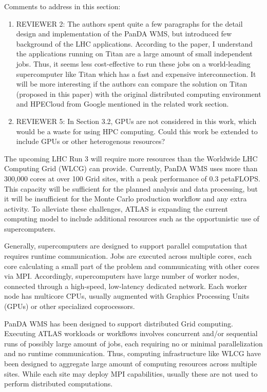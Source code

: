 \ifreview
Comments to address in this section:
\begin{enumerate}
	\item REVIEWER 2: The authors spent quite a few paragraphs for the detail
	design and implementation of the PanDA WMS, but introduced few background
	of the LHC applications. According to the paper, I understand the
	applications running on Titan are a large amount of small independent
	jobs. Thus, it seems less cost-effective to run these jobs on a
	world-leading supercomputer like Titan which has a fast and expensive
	interconnection. It will be more interesting if the authors can compare
	the solution on Titan (proposed in this paper) with the original
	distributed computing environment and HPECloud from Google mentioned in
	the related work section.
	\item REVIEWER 5: In Section 3.2, GPUs are not considered in this work,
	which would be a waste for using HPC computing. Could this work be
	extended to include GPUs or other heterogenous resources?
\end{enumerate}
\fi

The upcoming LHC Run 3 will require more resources than the Worldwide LHC
Computing Grid (WLCG) can provide. Currently, PanDA WMS uses more than
300,000 cores at over 100 Grid sites, with a peak performance of 0.3
petaFLOPS. This capacity will be sufficient for the planned analysis and data
processing, but it will be insufficient for the Monte Carlo production
workflow and any extra activity. To alleviate these challenges, ATLAS is
expanding the current computing model to include additional resources such as
the opportunistic use of supercomputers.

Generally, supercomputers are designed to support parallel computation that
requires runtime communication. Jobs are executed across multiple cores, each
core calculating a small part of the problem and communicating with other
cores via MPI. Accordingly, supercomputers have large number of worker nodes,
connected through a high-speed, low-latency dedicated network. Each worker
node has multicore CPUs, usually augmented with Graphics Processing Units
(GPUs) or other specialized coprocessors.

PanDA WMS has been designed to support distributed Grid computing. Executing
ATLAS workloads or workflows involves concurrent and/or sequential runs of
possibly large amount of jobs, each requiring no or minimal parallelization
and no runtime communication. Thus, computing infrastructure like WLCG have
been designed to aggregate large amount of computing resources across
multiple sites. While each site may deploy MPI capabilities, usually these
are not used to perform distributed computations.

